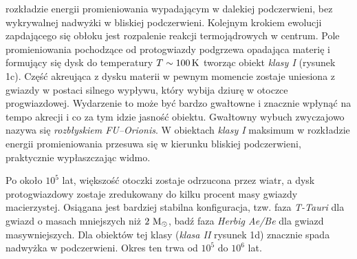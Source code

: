rozkładzie energii promieniowania wypadającym w dalekiej podczerwieni, bez
wykrywalnej nadwyżki w bliskiej podczerwieni.
Kolejnym krokiem ewolucji zapdającego się obłoku jest rozpalenie reakcji
termojądrowych w centrum. Pole promieniowania pochodzące od protogwiazdy
podgrzewa opadająca materię i formujący się dysk do temperatury $T \sim
100\hbox{$\thinspace\textrm{K}$}$ tworząc obiekt \emph{klasy I} (rysunek 1c).  Część
akreująca z dysku materii w pewnym momencie zostaje uniesiona z gwiazdy w
postaci silnego wypływu, który wybija dziurę w otoczce progwiazdowej. Wydarzenie
to może być bardzo gwałtowne i znacznie wpłynąć na tempo akrecji i co za tym
idzie jasność obiektu. Gwałtowny wybuch zwyczajowo nazywa się \emph{rozbłyskiem
FU--Orionis}.
W obiektach \emph{klasy I} maksimum w rozkładzie energii promieniowania przesuwa
się w kierunku bliskiej podczerwieni, praktycznie wypłaszczając widmo.  \par Po
około $10^5$ lat, większość otoczki zostaje odrzucona przez wiatr, a dysk
protogwiazdowy zostaje zredukowany do kilku procent masy gwiazdy macierzystej.
Osiągana jest bardziej stabilna konfiguracja, tzw. faza \emph{T-Tauri} dla
gwiazd o masach mniejszych niż $2\thinspace\hbox{$\mathrm{\thinspace M_{\odot}}$}$, badź faza \emph{Herbig Ae/Be}
dla gwiazd masywniejszych. Dla obiektów tej klasy (\emph{klasa II} rysunek 1d)
znacznie spada nadwyżka w podczerwieni. Okres ten trwa od $10^5$ do $10^6$ lat.


